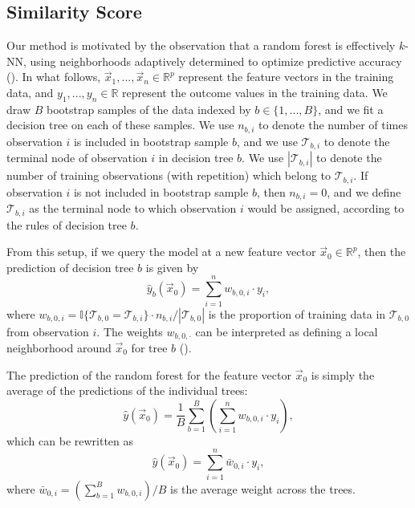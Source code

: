 \documentclass{article}
\begin{document}
\subsection{Similarity Score}

Our method is motivated by the observation that a random forest is effectively $k$-NN, using neighborhoods adaptively determined to optimize predictive accuracy (\cite{lin_random_2006}). In what follows, $\vec x_1, ..., \vec x_n \in \mathbb{R}^p$ represent the feature vectors in the training data, and $y_1, ..., y_n \in \mathbb{R}$ represent the outcome values in the training data. We draw $B$ bootstrap samples of the data indexed by $b \in \{1, ..., B\}$, and we fit a decision tree on each of these samples. We use $n_{b,i}$ to denote the number of times observation $i$ is included in bootstrap sample $b$, and we use $\mathcal{T}_{b,i}$ to denote the terminal node of observation $i$ in decision tree $b$. We use $|\mathcal{T}_{b,i}|$ to denote the number of training observations (with repetition) which belong to $\mathcal{T}_{b,i}$. If observation $i$ is not included in bootstrap sample $b$, then $n_{b,i} = 0$, and we define $\mathcal{T}_{b,i}$ as the terminal node to which observation $i$ would be assigned, according to the rules of decision tree $b$.

From this setup, if we query the model at a new feature vector $\vec x_0 \in \mathbb{R}^p$, then the prediction of decision tree $b$ is given by
$$
  \hat{y}_b(\vec x_0) = \sum_{i = 1}^{n} w_{b,0,i} \cdot y_i,
$$
where $w_{b,0,i} = \mathbb{I}\{\mathcal{T}_{b,0} = \mathcal{T}_{b,i}\} \cdot n_{b,i} / |\mathcal{T}_{b,0}|$ is the proportion of training data in $\mathcal{T}_{b,0}$ from observation $i$. The weights $w_{b,0,\cdot}$ can be interpreted as defining a local neighborhood around $\vec x_0$ for tree $b$ (\cite{lin_random_2006}).

The prediction of the random forest for the feature vector $\vec x_0$ is simply the average of the predictions of the individual trees:
\begin{equation*}
  \hat{y}(\vec x_0) = \frac{1}{B} \sum_{b = 1}^B \left(\sum_{i = 1}^{n} w_{b,0,i} \cdot y_i\right),
\end{equation*}
which can be rewritten as
\begin{equation}
  \label{eqn:rf-as-knn}
  \hat{y}(\vec x_0) = \sum_{i = 1}^n \bar w_{0,i} \cdot y_i,
\end{equation}
where $\bar w_{0,i} = \left(\sum_{b = 1}^B w_{b,0,i}\right) / B$ is the average weight across the trees.
\end{document}
